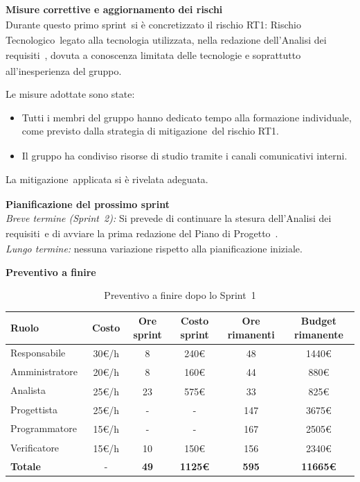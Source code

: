 \documentclass[a4paper,12pt]{article}
\newcommand{\pediceG}{\texorpdfstring{\textsubscript{\scalebox{0.6}{\textbf{G}}}~}{G}}
\begin{document}
\noindent\textbf{Misure correttive e aggiornamento dei rischi\pediceG}\\
Durante questo primo sprint\pediceG si è concretizzato il rischio RT1: Rischio Tecnologico\pediceG legato alla tecnologia utilizzata, nella redazione dell'Analisi dei requisiti\pediceG, dovuta a conoscenza limitata delle tecnologie e soprattutto all'inesperienza del gruppo.

Le misure adottate sono state:
\begin{itemize}
    \item Tutti i membri del gruppo hanno dedicato tempo alla formazione individuale, come previsto dalla strategia di mitigazione\pediceG del rischio RT1.
    \item Il gruppo ha condiviso risorse di studio tramite i canali comunicativi interni.
\end{itemize}

La mitigazione\pediceG applicata si è rivelata adeguata.
\vspace{0.5cm}

\noindent\textbf{Pianificazione del prossimo sprint}\\
\textit{Breve termine (Sprint\pediceG 2):} Si prevede di continuare la stesura dell'Analisi dei requisiti\pediceG e di avviare la prima redazione del Piano di Progetto\pediceG.\\

\textit{Lungo termine:} nessuna variazione rispetto alla pianificazione iniziale.

\newpage
\noindent\textbf{Preventivo a finire}

\begin{table}[H]
\centering
\footnotesize
\begin{tabular}{|l|c|c|c|c|c|}
\hline
Ruolo & Costo & Ore sprint & Costo sprint & Ore rimanenti & Budget rimanente \\
\hline
Responsabile\pediceG & 30€/h & 8 & 240€ & 48 & 1440€ \\
\hline
Amministratore\pediceG & 20€/h & 8 & 160€ & 44 & 880€ \\
\hline
Analista\pediceG & 25€/h & 23 & 575€ & 33 & 825€ \\
\hline
Progettista\pediceG & 25€/h & - & - & 147 & 3675€ \\
\hline
Programmatore\pediceG & 15€/h & - & - & 167 & 2505€ \\
\hline
Verificatore\pediceG & 15€/h & 10 & 150€ & 156 & 2340€ \\
\hline
\textbf{Totale} & - & \textbf{49} & \textbf{1125€} & \textbf{595} & \textbf{11665€} \\
\hline
\end{tabular}
\caption{Preventivo a finire dopo lo Sprint\pediceG 1}
\label{tab:risorse-sprint1}
\end{table}
\end{document}
